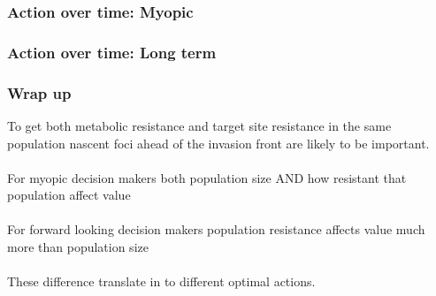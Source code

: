 \documentclass[]{beamer}
\begin{document}
  \begin{frame}
    \frametitle{Action over time: Myopic}
  \end{frame}

 \begin{frame}
    \frametitle{Action over time: Long term}
  \end{frame}

  \begin{frame}
    \frametitle{Wrap up}
    To get both metabolic resistance and target site resistance in the same population nascent foci ahead of the invasion front are likely to be important.
    \\~\\ 
    For myopic decision makers both population size AND how resistant that population affect value
    \\~\\
    For forward looking decision makers population resistance affects value much more than population size       
    \\~\\
    These difference translate in to different optimal actions.  
  \end{frame}
\end{document}
